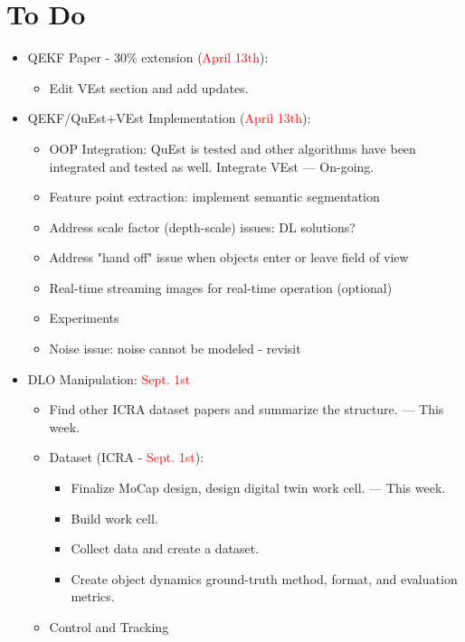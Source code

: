 \documentclass[11pt]{article}
\begin{document}
\section{To Do}
\begin{itemize}
  \item QEKF Paper - 30\% extension (\textcolor{red}{April 13th}):
  \begin{itemize}
      \item Edit VEst section and add updates.
  \end{itemize}
  \item QEKF/QuEst+VEst Implementation (\textcolor{red}{April 13th}):
  \begin{itemize}
      \item OOP Integration: QuEst is tested and other algorithms have been
      integrated and tested as well. Integrate VEst --- On-going.
      \item Feature point extraction: implement semantic segmentation
      \item Address scale factor (depth-scale) issues: DL solutions?
      \item Address "hand off" issue when objects enter or leave field of view
      \item Real-time streaming images for real-time operation (optional)
      \item Experiments
      \item Noise issue: noise cannot be modeled - revisit
  \end{itemize}
  \item  DLO Manipulation:  \textcolor{red}{Sept. 1st}
  \begin{itemize}
      \item Find other ICRA dataset papers and summarize the structure. --- This week.
      \item Dataset (ICRA -  \textcolor{red}{Sept. 1st}):
      \begin{itemize}
            \item Finalize MoCap design, design digital twin work cell. --- This week.
            \item Build work cell.
            \item Collect data and create a dataset.
            \item Create object dynamics ground-truth method, format, and evaluation
            metrics.
      \end{itemize}
      \item Control and Tracking
      \begin{itemize}

\end{itemize}
\end{itemize}
\end{itemize}
\end{document}
